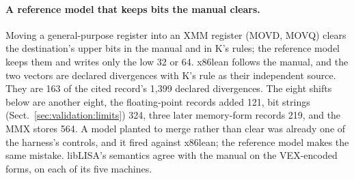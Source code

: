 \documentclass[runningheads]{llncs}
\newcommand{\src}[1]{}  %
\begin{document}
\paragraph{A reference model that keeps bits the manual clears.}
Moving a general-purpose register into an XMM register (MOVD, MOVQ) clears the destination's upper bits in
the manual and in K's rules; the reference model keeps them and writes only the low 32 or 64. x86lean
follows the manual, and the two vectors are declared divergences with K's rule as their independent
source. They are 163 of the cited record's 1{,}399 declared divergences. The eight shifts below are
another eight, the floating-point records added 121, bit strings (Sect.~\ref{sec:validation:limits}) 324,
three later memory-form records 219, and the MMX stores 564. A model planted to merge rather than
clear was already one of the harness's controls, and it fired against x86lean; the reference model
makes the same mistake. libLISA's semantics agree with the manual on the VEX-encoded forms, on each
of its five machines.
\src{docs/DECISIONS.md D93, sections 1 and 2 (the planted arm, and K's movd\_xmm\_r32.k and movq\_xmm\_r64.k);
Main.lean knownDivergences, movd\_to\_x and movq\_to\_x; docs/DECISIONS.md D108, the first run's record
``unexplained=8 oracle-divergence=163'', taken while those two were the only declared entries, and 171 once the
eight shifts were declared; docs/CLAIMS.tsv[movdq\_divergences, diff\_diverged, fp\_divergences\_added, p2\_shift\_divergences, liblisa\_machines,
memrecords\_divergences\_added, mmx\_divergences\_added]; 1{,}399 = 835 + BATCH46's 564 (the MMX stores that leave the x87 tag word alone, declared by D403 on silicon); 835 = 171 + the four floating-point records' increases (DIFFERENTIAL-P2-BATCH27, 29, 31 and 35: +50, +11, +12, +48) + BATCH40's 324 for the 29 bit-string entries + BATCH42's 6, BATCH43's 171 and BATCH44's 42 (at the pin) (D331, docs/CLAIMS.tsv[bitstring\_divergences\_added]); every other record from BATCH22 to BATCH39 adds 0, D300; docs/LIBLISA-HARDWARE-CHECK-2026-09-12.md, the vmovd and vmovq verdicts; D221; docs/DECISIONS.md D248}
\end{document}
